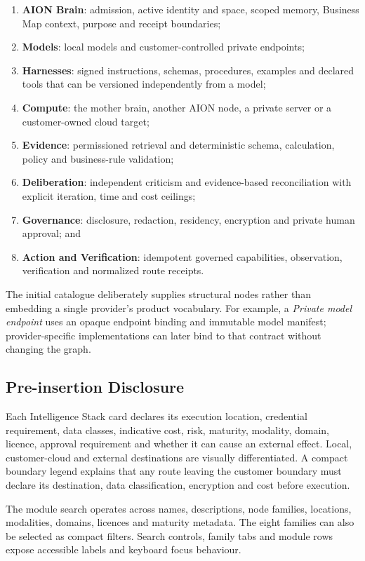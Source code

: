 \begin{enumerate}
  \item \textbf{AION Brain}: admission, active identity and space, scoped memory, Business
  Map context, purpose and receipt boundaries;
  \item \textbf{Models}: local models and customer-controlled private endpoints;
  \item \textbf{Harnesses}: signed instructions, schemas, procedures, examples and declared
  tools that can be versioned independently from a model;
  \item \textbf{Compute}: the mother brain, another AION node, a private server or a
  customer-owned cloud target;
  \item \textbf{Evidence}: permissioned retrieval and deterministic schema, calculation,
  policy and business-rule validation;
  \item \textbf{Deliberation}: independent criticism and evidence-based reconciliation with
  explicit iteration, time and cost ceilings;
  \item \textbf{Governance}: disclosure, redaction, residency, encryption and private human
  approval; and
  \item \textbf{Action and Verification}: idempotent governed capabilities, observation,
  verification and normalized route receipts.
\end{enumerate}

The initial catalogue deliberately supplies structural nodes rather than embedding a single
provider's product vocabulary.  For example, a \emph{Private model endpoint} uses an opaque
endpoint binding and immutable model manifest; provider-specific implementations can later
bind to that contract without changing the graph.

\subsection{Pre-insertion Disclosure}

Each Intelligence Stack card declares its execution location, credential requirement, data
classes, indicative cost, risk, maturity, modality, domain, licence, approval requirement and
whether it can cause an external effect.  Local, customer-cloud and external destinations are
visually differentiated.  A compact boundary legend explains that any route leaving the
customer boundary must declare its destination, data classification, encryption and cost before
execution.

The module search operates across names, descriptions, node families, locations, modalities,
domains, licences and maturity metadata.  The eight families can also be selected as compact
filters.  Search controls, family tabs and module rows expose accessible labels and keyboard
focus behaviour.

